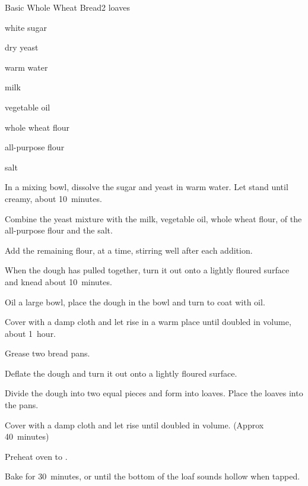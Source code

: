 \begin{recipe}{Basic Whole Wheat Bread}{}{2 loaves}


\begin{ingredients}
\item {} white sugar
\item {} dry yeast
\item \C{\threequarter} warm water
\item \C{\quarter} milk
\item {} vegetable oil
\item {} whole wheat flour
\item {} all-purpose flour
\item {} salt
\end{ingredients}

\begin{directions}
\item In a mixing bowl, dissolve the sugar and yeast in warm water. Let stand until creamy, about 10~minutes.
\item Combine the yeast mixture with the milk, vegetable oil, whole wheat flour,  of the all-purpose flour and the salt.
\item Add the remaining flour, \C{\half} at a time, stirring well after each addition.
\item When the dough has pulled together, turn it out onto a lightly floured surface and knead about 10~minutes.
\item Oil a large bowl, place the dough in the bowl and turn to coat with oil.
\item Cover with a damp cloth and let rise in a warm place until doubled in volume, about 1~hour.
\item Grease two bread pans.
\item Deflate the dough and turn it out onto a lightly floured surface.
\item Divide the dough into two equal pieces and form into loaves. Place the loaves into the pans.
\item Cover with a damp cloth and let rise until doubled in volume. (Approx 40~minutes)
\item Preheat oven to .
\item Bake for 30~minutes, or until the bottom of the loaf sounds hollow when tapped.
\end{directions}
\end{recipe}
